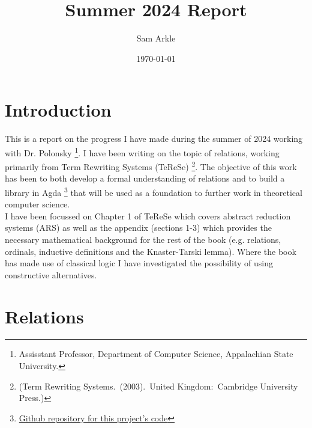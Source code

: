 \documentclass{scrartcl}
\title{Summer 2024 Report}
\author{Sam Arkle}
\date{\today}
\begin{document}
\maketitle

\section{Introduction}
This is a report on the progress I have made during the summer of 2024 working with Dr. Polonsky \footnote{Assisstant Professor, Department of Computer Science, Appalachian State University.}. I have been writing on the topic of relations, working primarily from Term Rewriting Systems (TeReSe) \footnote{(Term Rewriting Systems. (2003). United Kingdom: Cambridge University Press.)}. 
The objective of this work has been to both develop a formal understanding of relations and to build a library in Agda \footnote{\href{https://github.com/DrPolonsky/LAM/tree/main/Relations}{Github repository for this project's code}} that will be used as a foundation to further work in theoretical computer science.
\\
I have been focussed on Chapter 1 of TeReSe which covers abstract reduction systems (ARS) as well as the appendix (sections 1-3) which provides the necessary mathematical background for the rest of the book (e.g. relations, ordinals, inductive definitions and the Knaster-Tarski lemma). Where the book has made use of classical logic I have investigated the possibility of using constructive alternatives. 

\section{Relations}
\end{document}
